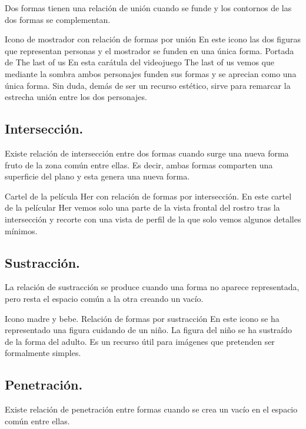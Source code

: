\documentclass[16pt,]{krantz}
\theoremstyle{definition}
\theoremstyle{definition}
\theoremstyle{definition}
\theoremstyle{definition}
\theoremstyle{remark}
\begin{document}
Dos formas tienen una relación de unión cuando se funde y los contornos de las dos formas se complementan.

Icono de mostrador con relación de formas por unión
En este icono las dos figuras que representan personas y el mostrador se funden en una única forma.
Portada de The last of us
En esta carátula del videojuego The last of us vemos que mediante la sombra ambos personajes funden sus formas y se aprecian como una única forma. Sin duda, demás de ser un recurso estético, sirve para remarcar la estrecha unión entre los dos personajes.

\hypertarget{intersecciuxf3n.}{%
\subsection{Intersección.}\label{intersecciuxf3n.}}

Existe relación de intersección entre dos formas cuando surge una nueva forma fruto de la zona común entre ellas. Es decir, ambas formas comparten una superficie del plano y esta genera una nueva forma.

Cartel de la película Her con relación de formas por intersección.
En este cartel de la películar Her vemos solo una parte de la vista frontal del rostro tras la intersección y recorte con una vista de perfil de la que solo vemos algunos detalles mínimos.

\hypertarget{sustracciuxf3n.}{%
\subsection{Sustracción.}\label{sustracciuxf3n.}}

La relación de sustracción se produce cuando una forma no aparece representada, pero resta el espacio común a la otra creando un vacío.

Icono madre y bebe. Relación de formas por sustracción
En este icono se ha representado una figura cuidando de un niño. La figura del niño se ha sustraído de la forma del adulto. Es un recurso útil para imágenes que pretenden ser formalmente simples.

\hypertarget{penetraciuxf3n.}{%
\subsection{Penetración.}\label{penetraciuxf3n.}}

Existe relación de penetración entre formas cuando se crea un vacío en el espacio común entre ellas.
\end{document}
